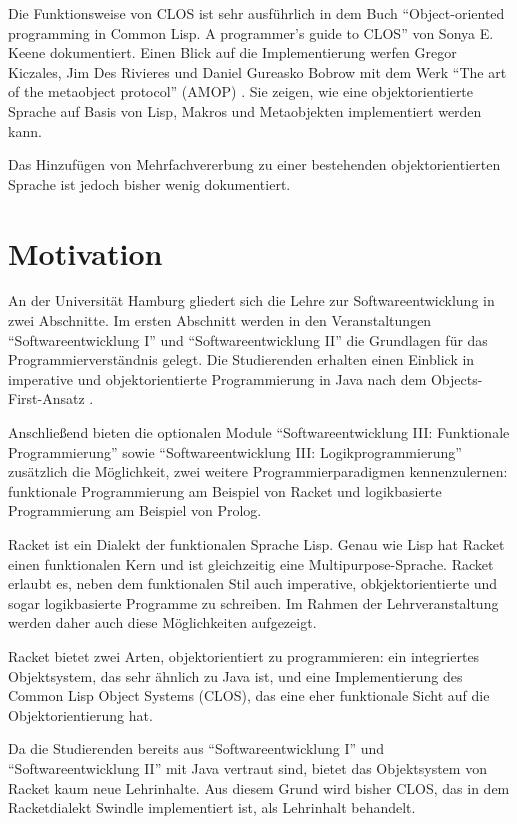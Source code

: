 Die Funktionsweise von CLOS ist sehr ausführlich in dem Buch ``Object-oriented programming in Common Lisp. A programmer's guide to CLOS'' von Sonya E. Keene \cite{keene} dokumentiert. Einen Blick auf die Implementierung werfen Gregor Kiczales, Jim Des Rivieres und Daniel Gureasko Bobrow mit dem Werk ``The art of the metaobject protocol'' (AMOP) \cite{amop}. Sie zeigen, wie eine objektorientierte Sprache auf Basis von Lisp, Makros und Metaobjekten implementiert werden kann. 

Das Hinzufügen von Mehrfachvererbung zu einer bestehenden objektorientierten Sprache ist jedoch bisher wenig dokumentiert. 

\section{Motivation} 
An der Universität Hamburg gliedert sich die Lehre zur Softwareentwicklung in zwei Abschnitte. Im ersten Abschnitt werden in den Veranstaltungen ``Softwareentwicklung I'' und ``Softwareentwicklung II'' die Grundlagen für das Programmierverständnis gelegt. Die Studierenden erhalten einen  Einblick in imperative und objektorientierte Programmierung in Java nach dem Objects-First-Ansatz \cite{objectsfirst}.

Anschließend bieten die optionalen Module ``Softwareentwicklung III: Funktionale Programmierung'' sowie ``Softwareentwicklung III: Logikprogrammierung'' zusätzlich die Möglichkeit, zwei weitere  Programmierparadigmen kennenzulernen: funktionale Programmierung am Beispiel von Racket und logikbasierte Programmierung am Beispiel von Prolog.

Racket ist ein Dialekt der funktionalen Sprache Lisp. Genau wie Lisp hat Racket einen funktionalen Kern und ist gleichzeitig eine Mul\-ti\-pur\-pose-Spra\-che. Racket erlaubt es, neben dem funktionalen Stil auch imperative, obkjektorientierte und sogar logikbasierte Programme zu schreiben. Im Rahmen der Lehrveranstaltung werden daher auch diese Möglichkeiten aufgezeigt. 

Racket bietet zwei Arten, objektorientiert zu programmieren: ein integriertes Objektsystem, das sehr ähnlich zu Java ist, und eine Implementierung des Common Lisp Object Systems (CLOS), das eine eher funktionale Sicht auf die Objektorientierung hat. 

Da die Studierenden bereits aus ``Softwareentwicklung I'' und ``Softwareentwicklung II'' mit Java vertraut sind, bietet das Objektsystem von Racket kaum neue Lehrinhalte. Aus diesem Grund wird bisher CLOS, das in dem Racketdialekt Swindle implementiert ist, als Lehrinhalt behandelt. 

